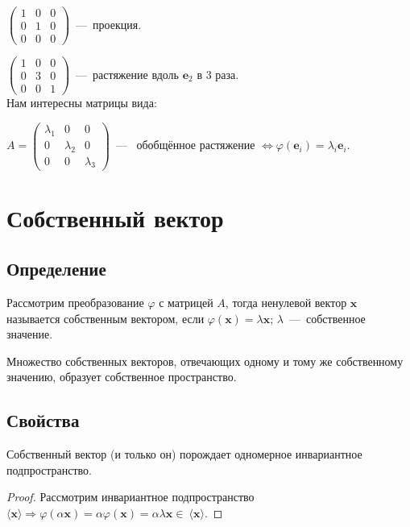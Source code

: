 $\left( \begin{array}{rrr}
1 & 0 & 0  \\
0 & 1& 0\\
0&0&0
\end{array}\right)$~---~проекция.

$\left( \begin{array}{rrr}
1 & 0 & 0  \\
0 & 3& 0\\
0&0&1
\end{array}\right)$~---~растяжение вдоль $\textbf{e$_2$}$ в 3 раза.\\

Нам интересны матрицы вида:

$A=\left( \begin{array}{ccc} %
\lambda_1 & 0 & 0  \\
0 & \lambda_2& 0\\
0&0&\lambda_3
\end{array}\right)$~---~ обобщённое растяжение $\Leftrightarrow \varphi(\textbf{e$_i$}) = \lambda_i\textbf{e$_i$}$.

\section{Собственный вектор}
\subsection{Определение}
Рассмотрим преобразование  $\varphi$ с матрицей $A$, тогда ненулевой вектор $\textbf{x}$ называется \textsf{собственным вектором}, если  $\varphi(\textbf{x}) = \lambda \textbf{x}$; $\lambda$~---~собственное значение. %

Множество собственных векторов, отвечающих одному и тому же собственному значению, образует \textsf{собственное пространство}.
\subsection{Свойства}
\begin{predlog} %
	Собственный вектор (и только он) порождает одномерное инвариантное подпространство. %
\end{predlog}
\begin{proof}
	Рассмотрим инвариантное подпространство  $\langle \textbf{x} \rangle \Rightarrow \varphi(\alpha \textbf{x}) = \alpha \varphi(\textbf{x}) = \alpha\lambda \textbf{x} \in~\langle \textbf{x}\rangle$.
\end{proof}
